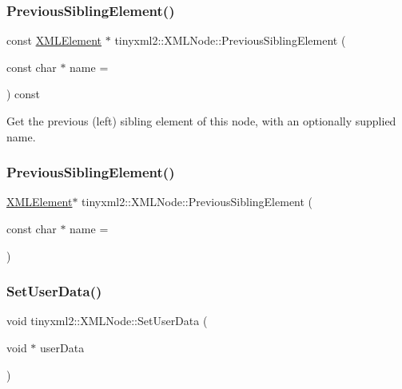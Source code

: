 \subsubsection{\texorpdfstring{Previous\+Sibling\+Element()}{PreviousSiblingElement()}\hspace{0.1cm}{\footnotesize\ttfamily [1/2]}}
{\footnotesize\ttfamily const \mbox{\hyperlink{classtinyxml2_1_1_x_m_l_element}{X\+M\+L\+Element}} $\ast$ tinyxml2\+::\+X\+M\+L\+Node\+::\+Previous\+Sibling\+Element (\begin{DoxyParamCaption}\item[{const char $\ast$}]{name = {} }\end{DoxyParamCaption}) const}



Get the previous (left) sibling element of this node, with an optionally supplied name. 

\mbox{\label{classtinyxml2_1_1_x_m_l_node_ae4f37eb6cd405bdf1d57caa066e36d87}} 
\subsubsection{\texorpdfstring{Previous\+Sibling\+Element()}{PreviousSiblingElement()}\hspace{0.1cm}{\footnotesize\ttfamily [2/2]}}
{\footnotesize\ttfamily \mbox{\hyperlink{classtinyxml2_1_1_x_m_l_element}{X\+M\+L\+Element}}$\ast$ tinyxml2\+::\+X\+M\+L\+Node\+::\+Previous\+Sibling\+Element (\begin{DoxyParamCaption}\item[{const char $\ast$}]{name = {} }\end{DoxyParamCaption})\hspace{0.3cm}{\ttfamily [inline]}}

\mbox{\label{classtinyxml2_1_1_x_m_l_node_a002978fc889cc011d143185f2377eca2}} 
\subsubsection{\texorpdfstring{Set\+User\+Data()}{SetUserData()}}
{\footnotesize\ttfamily void tinyxml2\+::\+X\+M\+L\+Node\+::\+Set\+User\+Data (\begin{DoxyParamCaption}\item[{void $\ast$}]{user\+Data }\end{DoxyParamCaption})\hspace{0.3cm}{\ttfamily [inline]}}

